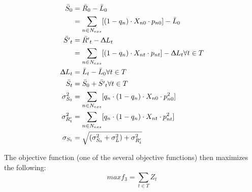 \documentclass[10pt]{amsart}
\begin{document}
\begin{equation}	
\begin{split}
\bar{S}_{0} &= \bar{R}_{0} - \bar{L}_{0} \\
&= \sum_{n \in N_{exs}} [(1-q_n)\cdot X_{n0} \cdot p_{n0}] - \bar{L}_0 \\
\bar{S'}_{t} &= \bar{R'}_{t} - \Updelta{L}_{t} \\
&= \sum_{n \in N_{exs}} [(1-q_n)\cdot X_{nt} \cdot p_{nt}] - \Updelta{L}_t  \forall t \in T \\
\Updelta{L}_{t} &= \bar{L}_{t} - \bar{L}_{0} \forall t \in T \\
\bar{S}_{t} &= \bar{S}_{0} + \bar{S'}_{t} \forall t \in T \\
\sigma^2_{S_0} &= \sum_{n \in N_{exs}} [q_n \cdot (1-q_n)\cdot X_{n0} \cdot p^2_{n0}] \\
\sigma^2_{R'_t} &= \sum_{n \in N_{exs}} [q_n \cdot (1-q_n)\cdot X_{nt} \cdot p^2_{nt}] \\
\sigma_{S_t} &= \sqrt{(\sigma^2_{S_0} + \sigma^2_{L}) + \sigma^2_{R'_t}}
\end{split}
\end{equation}

The objective function (one of the several objective functions) then maximizes the following: 
\begin{equation}
max f_3 = \sum_{t \in T} Z_t
\end{equation}

\printbibliography
\end{document}
